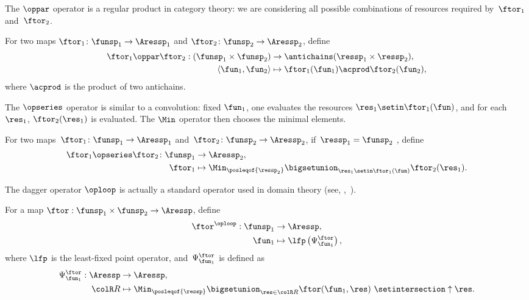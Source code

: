 The $\oppar$ operator is a regular product in category theory: we
are considering all possible combinations of resources required by~$\ftor_{1}$
and~$\ftor_{2}$.
\begin{definition}
    \label{def:opmaps}
    For two maps $\ftor_{1}\colon\funsp_{1}\rightarrow\Aressp_{1}$
    and $\ftor_{2}\colon\funsp_{2}\rightarrow\Aressp_{2}$, define
    \begin{align*}
        \ftor_{1}\oppar\ftor_{2}:(\funsp_{1}\times\funsp_{2}) & \rightarrow\antichains(\ressp_{1}\times\ressp_{2}), \\
        \left\langle \fun_{1},\fun_{2}\right\rangle           & \mapsto\ftor_{1}(\fun_{1})\acprod\ftor_{2}(\fun_{2}),
    \end{align*}
    where $\acprod$ is the product of two antichains.
\end{definition}
The $\opseries$ operator is similar to a convolution: fixed $\fun_{1}$,
one evaluates the resources $\res_{1}\setin\ftor_{1}(\fun)$, and for
each~$\res_{1}$, $\ftor_{2}(\res_{1})$ is evaluated.
The $\Min$
operator then chooses the minimal elements.
\begin{definition}
    \label{def:opseries}
    For two maps~$\ftor_{1}\colon\funsp_{1}\rightarrow\Aressp_{1}$
    and~$\ftor_{2}\colon\funsp_{2}\rightarrow\Aressp_{2}$, if~$\ressp_{1}=\funsp_{2}$
    , define
    \begin{align*}
        {\displaystyle \ftor_{1}\opseries\ftor_{2}\colon\funsp_{1}}
                  & \rightarrow\Aressp_{2}, \\
        \ftor_{1} & \mapsto\Min_{\posleqof{\ressp_{2}}}\bigsetunion_{\res_{1}\setin\ftor_{1}(\fun)}\ftor_{2}(\res_{1}).
    \end{align*}

\end{definition}

The dagger operator $\oploop$ is actually a standard operator used
in domain theory (see, \eg ,~\cite[II-2.29]{gierz03continuous}).
\begin{definition}
    \label{def:oploop}
    For a map $\ftor:\funsp_{1}\times\funsp_{2}\rightarrow\Aressp$,
    define
    \begin{align}
        \ftor^{\oploop}:\funsp_{1} & \rightarrow\Aressp,\nonumber \\
        \fun_{1}                   & \mapsto\lfp\left(\Psi_{\fun_{1}}^{\ftor}\right),
    \end{align}
    where $\lfp$ is the least-fixed point operator, and~$\Psi_{\fun_{1}}^{\ftor}$
    is defined as
    \begin{align*}
        \Psi_{\fun_{1}}^{\ftor}:\Aressp & \rightarrow\Aressp, \\
        {\colR R}                       & \mapsto\Min_{\posleqof{\ressp}}\bigsetunion_{\res\in{\colR R}}\ftor(\fun_{1},\res)\ \setintersection\uparrow\res.
    \end{align*}
\end{definition}

